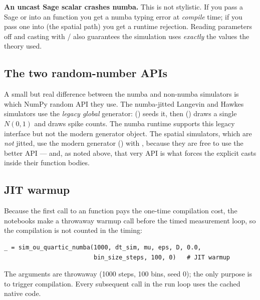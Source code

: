 \begin{gotcha}
\textbf{An uncast Sage scalar crashes numba.} This is not stylistic. If you pass a
Sage  or  into an  function you
get a numba typing error at \emph{compile} time; if you pass one into
 (the spatial path) you get a runtime rejection.
Reading parameters off  and casting with
 /  also guarantees the simulation uses
\emph{exactly} the values the theory used.
\end{gotcha}

\subsection{The two random-number APIs}

A small but real difference between the numba and non-numba simulators is which
NumPy random API they use. The numba-jitted Langevin and Hawkes simulators use the
\emph{legacy global} generator: 
() seeds it, then 
() draws a single $N(0,1)$ and
 draws spike counts. The numba runtime supports this
legacy interface but not the modern generator object. The spatial simulators, which
are \emph{not} jitted, use the modern  generator
() with , because
they are free to use the better API --- and, as noted above, that very API is what
forces the explicit  casts inside their function bodies.

\subsection{JIT warmup}

Because the first call to an  function pays the one-time compilation
cost, the notebooks make a throwaway warmup call before the timed measurement
loop, so the compilation is not counted in the timing:

\begin{lstlisting}
_ = sim_ou_quartic_numba(1000, dt_sim, mu, eps, D, 0.0,
                         bin_size_steps, 100, 0)   # JIT warmup
\end{lstlisting}

The arguments are throwaway (1000 steps, 100 bins, seed 0); the only purpose is to
trigger compilation. Every subsequent call in the run loop uses the cached native
code.

